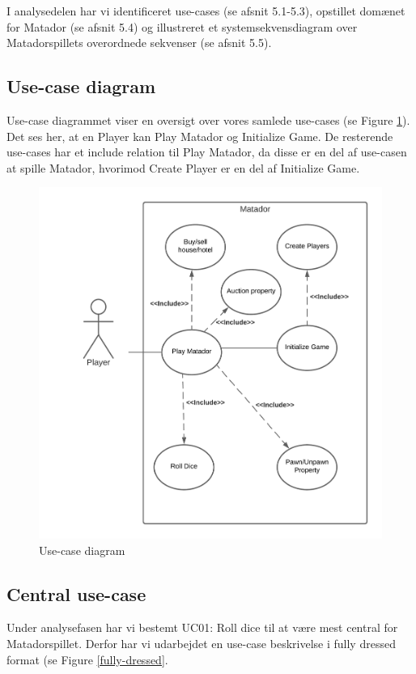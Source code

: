 \begin{flushleft}
\doublespacing
I analysedelen har vi identificeret use-cases (se afsnit 5.1-5.3), opstillet domænet for Matador (se afsnit 5.4) og illustreret et systemsekvensdiagram over Matadorspillets overordnede sekvenser (se afsnit 5.5).
\subsection{Use-case diagram}
Use-case diagrammet viser en oversigt over vores samlede use-cases (se Figure \ref{use-case diagram}). Det ses her, at en Player kan Play Matador og Initialize Game. De resterende use-cases har et include relation til Play Matador, da disse er en del af use-casen at spille Matador, hvorimod Create Player er en del af Initialize Game.
\begin{figure}[H]
    \centering
    \includegraphics[width=12cm]{Report/figures/Use Case Diagram.png}
    \caption{Use-case diagram}
    \label{use-case diagram}
\end{figure}

\subsection{Central use-case}
Under analysefasen har vi bestemt UC01: Roll dice til at være mest central for Matadorspillet. Derfor har vi udarbejdet en use-case beskrivelse i fully dressed format (se Figure \ref{fully-dressed}. \\


\end{flushleft}
